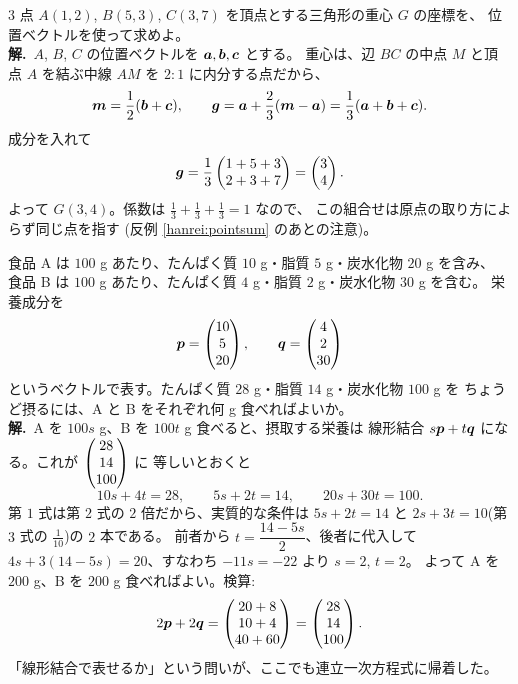 \begin{rei}[例題・標準(位置ベクトル)]\label{rei:centroid}
$3$ 点 $A(1, 2)$, $B(5, 3)$, $C(3, 7)$ を頂点とする三角形の重心 $G$ の座標を、
位置ベクトルを使って求めよ。\\
\textbf{解.}\ $A$, $B$, $C$ の位置ベクトルを $\bm{a}, \bm{b}, \bm{c}$ とする。
重心は、辺 $BC$ の中点 $M$ と頂点 $A$ を結ぶ中線 $AM$ を
$2 : 1$ に内分する点だから、
\[
\bm{m} = \frac{1}{2}(\bm{b} + \bm{c}), \qquad
\bm{g} = \bm{a} + \frac{2}{3}(\bm{m} - \bm{a})
= \frac{1}{3}(\bm{a} + \bm{b} + \bm{c}).
\]
成分を入れて
\[
\bm{g} = \frac{1}{3}\begin{pmatrix}1 + 5 + 3 \\ 2 + 3 + 7\end{pmatrix} = \begin{pmatrix}3 \\ 4\end{pmatrix}.
\]
よって $G(3, 4)$。係数は $\frac{1}{3} + \frac{1}{3} + \frac{1}{3} = 1$ なので、
この組合せは原点の取り方によらず同じ点を指す
(反例 \ref{hanrei:pointsum} のあとの注意)。
\end{rei}

\begin{rei}[例題・標準(データと線形結合)]
食品 A は $100$ g あたり、たんぱく質 $10$ g・脂質 $5$ g・炭水化物 $20$ g を含み、
食品 B は $100$ g あたり、たんぱく質 $4$ g・脂質 $2$ g・炭水化物 $30$ g を含む。
栄養成分を
\[
\bm{p} = \begin{pmatrix}10 \\ 5 \\ 20\end{pmatrix}, \qquad \bm{q} = \begin{pmatrix}4 \\ 2 \\ 30\end{pmatrix}
\]
というベクトルで表す。たんぱく質 $28$ g・脂質 $14$ g・炭水化物 $100$ g を
ちょうど摂るには、A と B をそれぞれ何 g 食べればよいか。\\
\textbf{解.}\ A を $100s$ g、B を $100t$ g 食べると、摂取する栄養は
線形結合 $s\bm{p} + t\bm{q}$ になる。これが $\begin{pmatrix}28 \\ 14 \\ 100\end{pmatrix}$ に
等しいとおくと
\[
10s + 4t = 28, \qquad 5s + 2t = 14, \qquad 20s + 30t = 100.
\]
第 $1$ 式は第 $2$ 式の $2$ 倍だから、実質的な条件は
$5s + 2t = 14$ と $2s + 3t = 10$(第 $3$ 式の $\frac{1}{10}$)の $2$ 本である。
前者から $t = \dfrac{14 - 5s}{2}$、後者に代入して
$4s + 3(14 - 5s) = 20$、すなわち $-11s = -22$ より $s = 2$, $t = 2$。
よって A を $200$ g、B を $200$ g 食べればよい。検算:
\[
2\bm{p} + 2\bm{q} = \begin{pmatrix}20 + 8 \\ 10 + 4 \\ 40 + 60\end{pmatrix} = \begin{pmatrix}28 \\ 14 \\ 100\end{pmatrix}.
\]
「線形結合で表せるか」という問いが、ここでも連立一次方程式に帰着した。
\end{rei}

